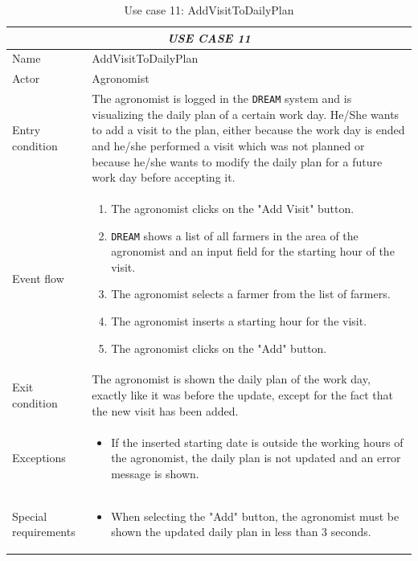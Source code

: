 \documentclass{article}
\begin{document}
\centering
\begin{longtable}{|p{3.5cm}|m{8cm}|}
\caption{Use case 11: AddVisitToDailyPlan}
 \label{uc11}
 \hline
 \multicolumn{2}{|c|}{\cellcolor{white}\emph{USE CASE 11}} \\
 \endfirsthead
 \endhead
 \endfoot
 \endlastfoot
 \hline
 Name & AddVisitToDailyPlan\\
 \hline
 Actor & Agronomist\\
 \hline
 Entry condition & The agronomist is logged in the \verb|DREAM| system and is visualizing the daily plan of a certain work day. He/She wants to add a visit to the plan, either because the work day is ended and he/she performed a visit which was not planned or because he/she wants to modify the daily plan for a future work day before accepting it.\\
 \hline
 Event flow & \begin{enumerate}
    \item The agronomist clicks on the "Add Visit" button.
    \item \verb|DREAM| shows a list of all farmers in the area of the agronomist and an input field for the starting hour of the visit.
    \item The agronomist selects a farmer from the list of farmers.
    \item The agronomist inserts a starting hour for the visit.
    \item The agronomist clicks on the "Add" button.
 \end{enumerate}\\
 \hline
 Exit condition & The agronomist is shown the daily plan of the work day, exactly like it was before the update, except for the fact that the new visit has been added.\\
 \hline
 Exceptions & \begin{itemize}
     \item If the inserted starting date is outside the working hours of the agronomist, the daily plan is not updated and an error message is shown.
 \end{itemize}\\
 \hline
 Special requirements &\begin{itemize}
     \item When selecting the "Add" button, the agronomist must be shown the updated daily plan in less than 3 seconds.
 \end{itemize}\\
 \hline
\end{longtable}
\end{document}
